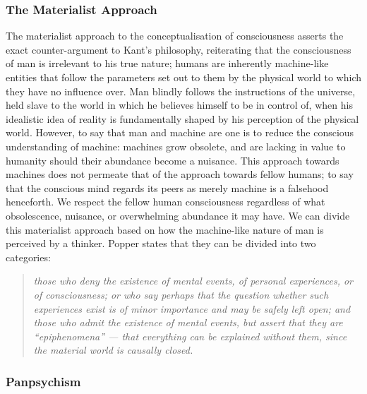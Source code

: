 \documentclass[openany,oneside,12pt,hidelinks]{book}
\begin{document}
\subsubsection{The Materialist Approach}

The materialist approach to the conceptualisation of consciousness asserts the
exact counter-argument to Kant's philosophy, reiterating that the
consciousness of man is irrelevant to his true nature; humans are inherently
machine-like entities that follow the parameters set out to them by the
physical world to which they have no influence over. Man blindly follows the
instructions of the universe, held slave to the world in which he believes
himself to be in control of, when his idealistic idea of reality is
fundamentally shaped by his perception of the physical world. However, to say
that man and machine are one is to reduce the conscious understanding of
machine: machines grow obsolete, and are lacking in value to humanity should
their abundance become a nuisance. This approach towards machines does not
permeate that of the approach towards fellow humans; to say that the conscious
mind regards its peers as merely machine is a falsehood henceforth. We respect
the fellow human consciousness regardless of what obsolescence, nuisance, or
overwhelming abundance it may have. We can divide this materialist approach
based on how the machine-like nature of man is perceived by a thinker. Popper
states that they can be divided into two categories:
\begin{quote}
  \textit{those who deny the existence of mental events, of personal
    experiences, or of consciousness; or who say perhaps that the question
    whether such experiences exist is of minor importance and may be safely left
    open; and those who admit the existence of mental events, but assert that
    they are ``epiphenomena'' --- that everything can be explained without them,
    since the material world is causally closed.}
\end{quote}

\subsubsection{Panpsychism}
\end{document}
